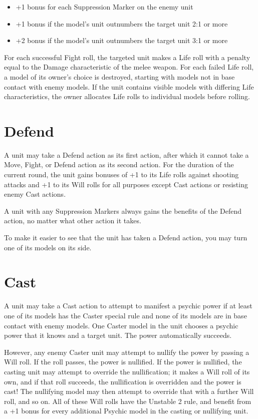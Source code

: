 \begin{multicols}{2}
\begin{itemize}
 \item +1 bonus for each Suppression Marker on the enemy unit
 \item +1 bonus if the model's unit outnumbers the target unit 2:1 or more
 \item +2 bonus if the model's unit outnumbers the target unit 3:1 or more
\end{itemize}

For each successful Fight roll, the targeted unit makes a Life roll with a penalty equal to the Damage characteristic of the melee weapon. For each failed Life roll, a model of its owner's choice is destroyed, starting with models not in base contact with enemy models. If the unit contains visible models with differing Life characteristics, the owner allocates Life rolls to individual models before rolling.




\section*{Defend}
A unit may take a Defend action as its first action, after which it cannot take a Move, Fight, or Defend action as its second action. For the duration of the current round, the unit gains bonuses of +1 to its Life rolls against shooting attacks and +1 to its Will rolls for all purposes except Cast actions or resisting enemy Cast actions.

A unit with any Suppression Markers always gains the benefits of the Defend action, no matter what other action it takes.

To make it easier to see that the unit has taken a Defend action, you may turn one of its models on its side.




\section*{Cast}
A unit may take a Cast action to attempt to manifest a psychic power if at least one of its models has the Caster special rule and none of its models are in base contact with enemy models. One Caster model in the unit chooses a psychic power that it knows and a target unit. The power automatically succeeds.

However, any enemy Caster unit may attempt to nullify the power by passing a Will roll. If the roll passes, the power is nullified. If the power is nullified, the casting unit may attempt to override the nullification; it makes a Will roll of its own, and if that roll succeeds, the nullification is overridden and the power is cast! The nullifying model may then attempt to override that with a further Will roll, and so on. All of these Will rolls have the Unstable 2 rule, and benefit from a +1 bonus for every additional Psychic model in the casting or nullifying unit.


\end{multicols}
